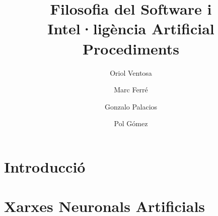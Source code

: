 \documentclass[a4paper,12pt]{report}
\date{}
\begin{document}


\title{
	{\bf Filosofia del Software i Intel·ligència Artificial} \\
	Procediments
}
\author{
	Oriol Ventosa \and
	Marc Ferré \and
	Gonzalo Palacios \and
	Pol Gómez
}

\maketitle

\tableofcontents

\chapter{Introducció}


\chapter{Xarxes Neuronals Artificials}


\printbibliography
\end{document}
